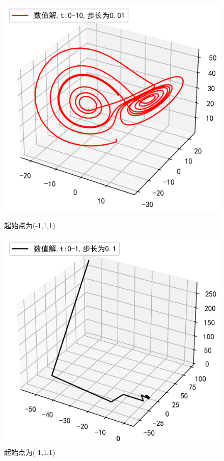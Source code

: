 \documentclass[a4paper]{article}%
\begin{document}
\begin{figure}[h]
    \begin{minipage}[h]{0.48\linewidth}
    \centering
    \includegraphics[scale=0.65]{43}
    \caption{起始点为(-1,1,1)}
    \end{minipage}
    \begin{minipage}[h]{0.48\linewidth}
    \centering
    \includegraphics[scale=0.65]{44}
    \caption{起始点为(-1,1,1)}
    \end{minipage}
\end{figure}
\end{document}
